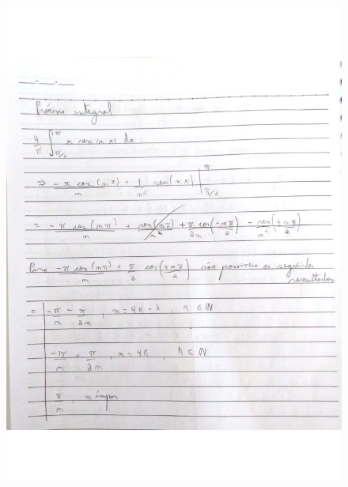 \documentclass[a4paper]{article}
\begin{document}
        \begin{figure}{\textwidth}
            \centering
            \includegraphics[width=\textwidth]{Questoes-1-3_page-0010.jpg}
        \end{figure}
\end{document}
